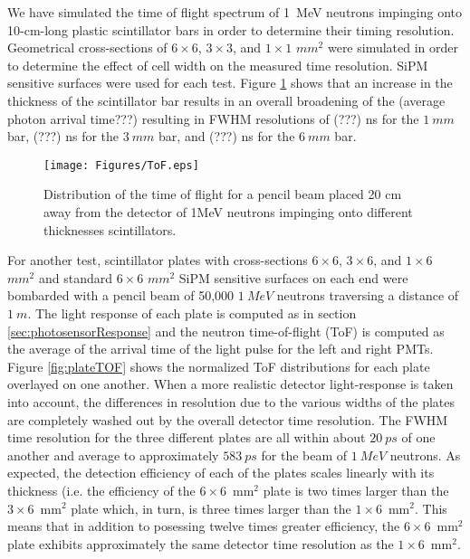 We have simulated the time of flight spectrum of 1~MeV neutrons impinging onto 10-cm-long plastic scintillator bars in order to determine their timing resolution. Geometrical cross-sections of $6 \times 6$, $3 \times 3$, and $1 \times 1$ $mm^{2}$ were simulated in order to determine the effect of cell width on the measured time resolution. SiPM sensitive surfaces were used for each test. Figure \ref{fig:ToF} shows that an increase in the thickness of the scintillator bar results in an overall broadening of the (average photon arrival time???) resulting in FWHM resolutions of (???) ns for the $1~mm$ bar, (???) ns for the $3~mm$ bar, and (???) ns for the $6~mm$ bar.

\begin{figure}[tb]
\centering
\texttt{[image: Figures/ToF.eps]}
\caption{Distribution of the time of flight for a pencil beam  placed 20 cm away from the detector of 1MeV  neutrons impinging onto different thicknesses scintillators.}
\label{fig:ToF}
\end{figure}

For another test, scintillator plates with cross-sections $6 \times 6$, $3 \times 6$, and $1 \times 6$ $mm^{2}$ and standard $6 \times 6$ $mm^{2}$ SiPM sensitive surfaces on each end were bombarded with a pencil beam of 50,000 $1~MeV$ neutrons traversing a distance of $1~m$. The light response of each plate is computed as in section \ref{sec:photosensorResponse} and the neutron time-of-flight (ToF) is computed as the average of the arrival time of the light pulse for the left and right PMTs. Figure \ref{fig:plateTOF} shows the normalized ToF distributions for each plate overlayed on one another. When a more realistic detector light-response is taken into account, the differences in resolution due to the various widths of the plates are completely washed out by the overall detector time resolution. The FWHM time resolution for the three different plates are all within about $20~ps$ of one another and average to approximately $583~ps$ for the beam of $1~MeV$ neutrons. As expected, the detection efficiency of each of the plates scales linearly with its thickness (i.e. the efficiency of the $6 \times 6$~mm$^2$ plate is two times larger than the $3 \times 6$~mm$^2$ plate which, in turn, is three times larger than the $1 \times 6$~mm$^2$. This means that in addition to posessing twelve times greater efficiency, the $6 \times 6$~mm$^2$ plate exhibits approximately the same detector time resolution as the $1 \times 6$~mm$^2$.  

